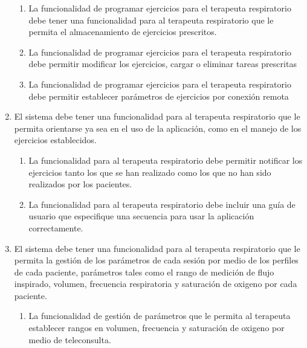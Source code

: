 \documentclass[12pt]{article}
\begin{document}
\begin{enumerate}[start=1,label={\bfseries RF0\arabic*.}]
\begin{enumerate}[label*=\arabic*.]
                \item La funcionalidad de programar ejercicios para el terapeuta respiratorio debe tener una funcionalidad para al terapeuta respiratorio que le permita el almacenamiento de ejercicios prescritos. %
                
                \item La funcionalidad de programar ejercicios para el terapeuta respiratorio debe permitir modificar los ejercicios, cargar o eliminar tareas prescritas
                
                \item La funcionalidad de programar ejercicios para el terapeuta respiratorio debe permitir establecer parámetros de ejercicios por conexión remota
     
     
                
            \end{enumerate}
            
    \item  El sistema debe tener una funcionalidad para al terapeuta respiratorio que le permita orientarse ya sea en el uso de la aplicación, como en el manejo de los ejercicios establecidos.
    
    \label{RF03}
            \begin{enumerate}[label*=\arabic*.]
                \item La funcionalidad para al terapeuta respiratorio debe permitir notificar los ejercicios tanto los que se han realizado como los que no han sido realizados por los pacientes. 
                
                \item La funcionalidad para al terapeuta respiratorio debe incluir una guía de usuario que especifique una secuencia para usar la aplicación correctamente. %
            \end{enumerate}
            
    
    \item  El sistema debe tener una funcionalidad para al terapeuta respiratorio que le permita la gestión de los parámetros de cada sesión por medio de los perfiles de cada paciente, parámetros tales como  el rango de medición de flujo inspirado, volumen, frecuencia respiratoria y saturación de oxigeno por cada paciente. %
    \label{RF04}
            \begin{enumerate}[label*=\arabic*.]
                \item La funcionalidad de gestión de parámetros que le permita al terapeuta establecer rangos en volumen, frecuencia y saturación de oxigeno por medio de teleconsulta. %
                

\end{enumerate}
\end{enumerate}
\end{document}
